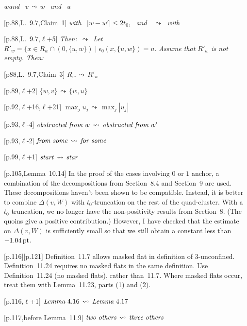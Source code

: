 \documentclass[11pt]{amsart}
\def\op#1{{\text{#1}}}
\def\lto{\ensuremath{\,\leadsto\,}}
\def\line{$\ell$}
\def\text{\hbox}
\def\sz{small} %
\def\rmx{\rm}
\begin{document}
\begin{\sz}
[p.88,Lemma~9.7,\line+2] 
	$w$\text{{\it  and} } $v$\lto $w$ \text{ {\it and} } $u$

	
[p.88,L.~9.7,Claim~1]
	\text{{\it  with }} $|w - w'|\le 2t_0$, \text{ {\it and} }
	\lto \text{ {\it with} }

	
[p.88,L.~9.7,\line+5]
         {\it Then: $\lto$ Let
          $
          R'_w = \{x\in R_w \cap(0,\{u,w\})\mid 
          \epsilon_0(x,\{u,w\}) = u.
          $
          Assume that $R'_w$ is not empty. Then:}

[p88,L.~9.7,Claim~3]
        $R_w \lto R'_w$

[p.89,\line+2]
	$
	\{w,v\}\lto\{w,u\}
	$

[p.92,\line+16,\line+21]
   $     \max_j u_j \lto \max_j |u_j|$
	
[p.93,\line-4]
	$
	\text{{\it obstructed from} }w \lto
	\text{{\it obstructed from} }w'
	$
		
[p.93,\line-2]
	$
	\text{{\it from some}} \lto \text{{\it for some}}
	$

[p.99,\line+1]
        $
        \text{{\it start}} \lto \text{{\it star}}
        $

[p.105,Lemma~10.14]  {\rmx In the proof of the cases involving
   $0$ or $1$ anchor, a combination of the decompositions from
   Section~8.4 and Section~9 are used.  These decompositions haven't
   been shown to be compatible.  
   Instead, it is better to combine
   $\Delta(v,W)$ with $t_0$-truncation on the rest of the quad-cluster.
   With a $t_0$ truncation, we no longer have the non-positivity results
   from Section~8.  (The quoins give a positive contribution.) However,
   I have checked that
   the estimate on $\Delta(v,W)$ is sufficiently small so that we still
   obtain a constant less than $-1.04\,\op{pt}$.}
   

[p.116][p.121] {\rmx Definition~11.7 allows masked
flat in definition of $3$-unconfined.
Definition~11.24 requires no masked flats
in the same definition.  Use Definition~11.24 (no masked flats), rather than~11.7.  
Where masked flats occur,
treat them with Lemma~11.23, parts (1) and (2).}

[p.116,\line+1] 
	$
	\text{{\it Lemma}}~4.16 \lto \text{{\it Lemma}}~4.17
	$

[p.117,before Lemma~11.9]
	$
	\text{\it two others} \lto \text{\it three others}
	$
	

\end{\sz}
\end{document}
